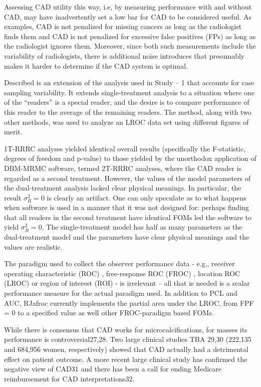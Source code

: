 \documentclass[
]{book}
\begin{document}
Assessing CAD utility this way, i.e, by measuring performance with and without CAD, may have inadvertently set a low bar for CAD to be considered useful. As examples, CAD is not penalized for missing cancers as long as the radiologist finds them and CAD is not penalized for excessive false positives (FPs) as long as the radiologist ignores them. Moreover, since both such measurements include the variability of radiologists, there is additional noise introduces that presumably makes it harder to determine if the CAD system is optimal.

Described is an extension of the analysis used in Study -- 1 that accounts for case sampling variability. It extends \citep{hillis2005comparison} single-treatment analysis to a situation where one of the ``readers'' is a special reader, and the desire is to compare performance of this reader to the average of the remaining readers. The method, along with two other methods, was used to analyze an LROC data set using different figures of merit.

1T-RRRC analyses yielded identical overall results (specifically the F-statistic, degrees of freedom and p-value) to those yielded by the unorthodox application of DBM-MRMC software, termed 2T-RRRC analyses, where the CAD reader is regarded as a second treatment. However, the values of the model parameters of the dual-treatment analysis lacked clear physical meanings. In particular, the result \(\sigma_R^2 = 0\) is clearly an artifact. One can only speculate as to what happens when software is used in a manner that it was not designed for: perhaps finding that all readers in the second treatment have identical FOMs led the software to yield \(\sigma_R^2 = 0\). The single-treatment model has half as many parameters as the dual-treatment model and the parameters have clear physical meanings and the values are realistic.

The paradigm used to collect the observer performance data - e.g., receiver operating characteristic (ROC) \citep{metz1986rocmethodology}, free-response ROC (FROC) \citep{Chakraborty1986DigitalVsConv}, location ROC (LROC) \citep{starr1975visual} or region of interest (ROI) \citep{obuchowski2010data} - is irrelevant -- all that is needed is a scalar performance measure for the actual paradigm used. In addition to PCL and AUC, RJafroc currently implements the partial area under the LROC, from FPF = 0 to a specified value as well other FROC-paradigm based FOMs.

While there is consensus that CAD works for microcalcifications, for masses its performance is controversial27,28. Two large clinical studies TBA 29,30 (222,135 and 684,956 women, respectively) showed that CAD actually had a detrimental effect on patient outcome. A more recent large clinical study has confirmed the negative view of CAD31 and there has been a call for ending Medicare reimbursement for CAD interpretations32.
\end{document}

